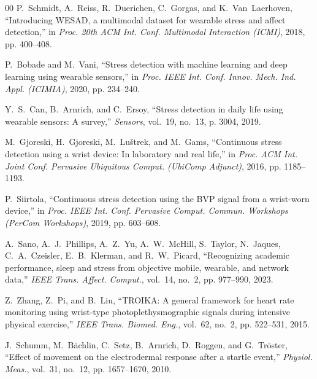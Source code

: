 \documentclass[conference]{IEEEtran}
\begin{document}
\begin{thebibliography}{00}
P.~Schmidt, A.~Reiss, R.~Duerichen, C.~Gorgas, and K.~Van~Laerhoven, ``Introducing WESAD, a multimodal dataset for wearable stress and affect detection,'' in \textit{Proc. 20th ACM Int. Conf. Multimodal Interaction (ICMI)}, 2018, pp. 400--408.

P.~Bobade and M.~Vani, ``Stress detection with machine learning and deep learning using wearable sensors,'' in \textit{Proc. IEEE Int. Conf. Innov. Mech. Ind. Appl. (ICIMIA)}, 2020, pp. 234--240.

Y.~S.~Can, B.~Arnrich, and C.~Ersoy, ``Stress detection in daily life using wearable sensors: A survey,'' \textit{Sensors}, vol.~19, no.~13, p. 3004, 2019.

M.~Gjoreski, H.~Gjoreski, M.~Lu\v{s}trek, and M.~Gams, ``Continuous stress detection using a wrist device: In laboratory and real life,'' in \textit{Proc. ACM Int. Joint Conf. Pervasive Ubiquitous Comput. (UbiComp Adjunct)}, 2016, pp. 1185--1193.

P.~Siirtola, ``Continuous stress detection using the BVP signal from a wrist-worn device,'' in \textit{Proc. IEEE Int. Conf. Pervasive Comput. Commun. Workshops (PerCom Workshops)}, 2019, pp. 603--608.

A.~Sano, A.~J.~Phillips, A.~Z.~Yu, A.~W.~McHill, S.~Taylor, N.~Jaques, C.~A.~Czeisler, E.~B.~Klerman, and R.~W.~Picard, ``Recognizing academic performance, sleep and stress from objective mobile, wearable, and network data,'' \textit{IEEE Trans. Affect. Comput.}, vol.~14, no.~2, pp. 977--990, 2023.

Z.~Zhang, Z.~Pi, and B.~Liu, ``TROIKA: A general framework for heart rate monitoring using wrist-type photoplethysmographic signals during intensive physical exercise,'' \textit{IEEE Trans. Biomed. Eng.}, vol.~62, no.~2, pp. 522--531, 2015.

J.~Schumm, M.~B\"achlin, C.~Setz, B.~Arnrich, D.~Roggen, and G.~Tr\"oster, ``Effect of movement on the electrodermal response after a startle event,'' \textit{Physiol. Meas.}, vol.~31, no.~12, pp. 1657--1670, 2010.


\end{thebibliography}
\end{document}
